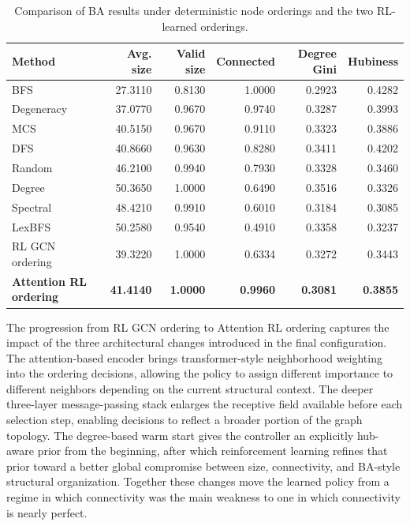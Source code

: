 \begin{table}[H]
\centering
\footnotesize
\begin{tabular}{lrrrrr}
\toprule
\textbf{Method} & \textbf{Avg. size} & \textbf{Valid size} & \textbf{Connected} & \textbf{Degree Gini} & \textbf{Hubiness} \\
\midrule
BFS                       & 27.3110 & 0.8130 & 1.0000 & 0.2923 & 0.4282 \\
Degeneracy                & 37.0770 & 0.9670 & 0.9740 & 0.3287 & 0.3993 \\
MCS                       & 40.5150 & 0.9670 & 0.9110 & 0.3323 & 0.3886 \\
DFS                       & 40.8660 & 0.9630 & 0.8280 & 0.3411 & 0.4202 \\
Random                    & 46.2100 & 0.9940 & 0.7930 & 0.3328 & 0.3460 \\
Degree                    & 50.3650 & 1.0000 & 0.6490 & 0.3516 & 0.3326 \\
Spectral                  & 48.4210 & 0.9910 & 0.6010 & 0.3184 & 0.3085 \\
LexBFS                    & 50.2580 & 0.9540 & 0.4910 & 0.3358 & 0.3237 \\
\midrule
RL GCN ordering           & 39.3220 & 1.0000 & 0.6334 & 0.3272 & 0.3443 \\
\textbf{Attention RL ordering} & \textbf{41.4140} & \textbf{1.0000} & \textbf{0.9960} & \textbf{0.3081} & \textbf{0.3855} \\
\bottomrule
\end{tabular}
\caption{Comparison of BA results under deterministic node orderings and the two RL-learned orderings.}
\label{tab:ba-comparison-full}
\end{table}

The progression from RL GCN ordering to Attention RL ordering captures the impact of the three architectural changes introduced in the final configuration. The attention-based encoder brings transformer-style neighborhood weighting into the ordering decisions, allowing the policy to assign different importance to different neighbors depending on the current structural context. The deeper three-layer message-passing stack enlarges the receptive field available before each selection step, enabling decisions to reflect a broader portion of the graph topology. The degree-based warm start gives the controller an explicitly hub-aware prior from the beginning, after which reinforcement learning refines that prior toward a better global compromise between size, connectivity, and BA-style structural organization. Together these changes move the learned policy from a regime in which connectivity was the main weakness to one in which connectivity is nearly perfect.

